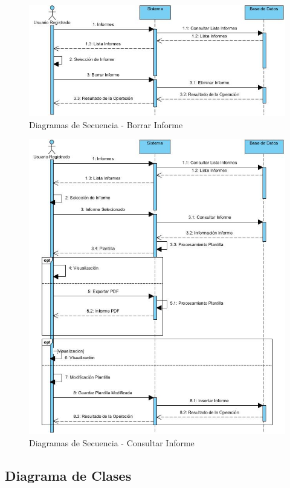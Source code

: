 \documentclass[a4paper,11pt]{book}
\begin{document}
\begin{figure}[H] 
\centering 
\includegraphics[scale=0.50]{imagenes/secuencia/Borrar_Informe.jpg}
\caption{ Diagramas de Secuencia - Borrar Informe\cite{diagrama}  }  
\end{figure}

\begin{figure}[H] 
\centering 
\includegraphics[scale=0.50]{imagenes/secuencia/Consultar_Informe.jpg}
\caption{ Diagramas de Secuencia - Consultar Informe\cite{diagrama}  }  
\end{figure}

\subsection{Diagrama de Clases}
\end{document}
